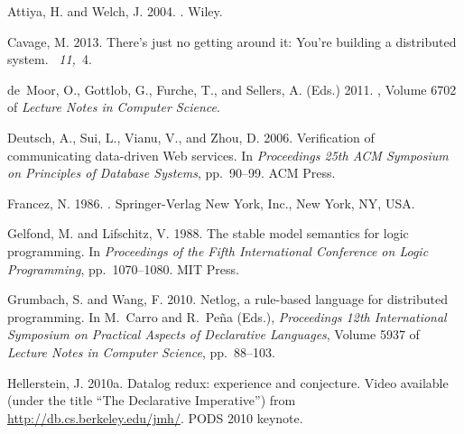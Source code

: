 \documentclass{tlp}
\begin{document}
\begin{thebibliography}{}
{\sc Attiya, H.} {\sc and} {\sc Welch, J.} 2004.
.
\newblock Wiley.

{\sc Cavage, M.} 2013.
\newblock There's just no getting around it: You're building a distributed
  system.
~{\em 11,\/}~4.

{\sc de~Moor, O.}, {\sc Gottlob, G.}, {\sc Furche, T.}, {\sc and} {\sc Sellers,
  A.} (Eds.) 2011.
,
  Volume 6702 of {\em Lecture Notes in Computer Science}.

{\sc Deutsch, A.}, {\sc Sui, L.}, {\sc Vianu, V.}, {\sc and} {\sc Zhou, D.}
  2006.
\newblock Verification of communicating data-driven {W}eb services.
\newblock In {\em Proceedings 25th ACM Symposium on Principles of Database
  Systems}, pp.\  90--99. ACM Press.

{\sc Francez, N.} 1986.
.
\newblock Springer-Verlag New York, Inc., New York, NY, USA.

{\sc Gelfond, M.} {\sc and} {\sc Lifschitz, V.} 1988.
\newblock The stable model semantics for logic programming.
\newblock In {\em Proceedings of the Fifth International Conference on Logic
  Programming}, pp.\  1070--1080. MIT Press.

{\sc Grumbach, S.} {\sc and} {\sc Wang, F.} 2010.
\newblock Netlog, a rule-based language for distributed programming.
\newblock In {\sc M.~Carro} {\sc and} {\sc R.~{Pe\~na}} (Eds.), {\em
  Proceedings 12th International Symposium on Practical Aspects of Declarative
  Languages}, Volume 5937 of {\em Lecture Notes in Computer Science}, pp.\
  88--103.

{\sc Hellerstein, J.} 2010a.
\newblock Datalog redux: experience and conjecture.
\newblock Video available (under the title ``The Declarative Imperative'') from
  \url{http://db.cs.berkeley.edu/jmh/}.
\newblock PODS 2010 keynote.


\end{thebibliography}
\end{document}
